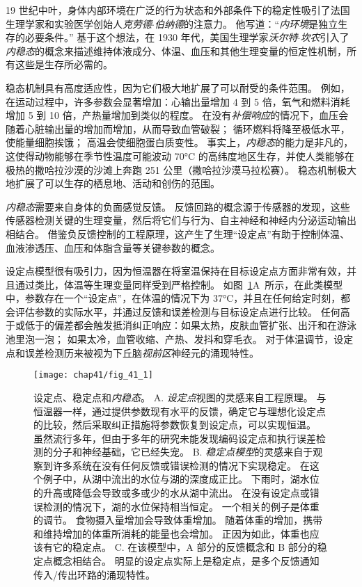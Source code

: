 19 世纪中叶，身体内部环境在广泛的行为状态和外部条件下的稳定性吸引了法国生理学家和实验医学创始人\textit{克劳德$\cdot$伯纳德}的注意力。
他写道：“\textit{内环境}是独立生存的必要条件。” 
基于这个想法，在 1930 年代，美国生理学家\textit{沃尔特$\cdot$坎农}引入了\textit{内稳态}的概念来描述维持体液成分、体温、血压和其他生理变量的恒定性机制，所有这些是生存所必需的。


稳态机制具有高度适应性，因为它们极大地扩展了可以耐受的条件范围。
例如，在运动过程中，许多参数会显著增加：心输出量增加 4 到 5 倍，氧气和燃料消耗增加 5 到 10 倍，产热量增加到类似的程度。
在没有\textit{补偿响应}的情况下，血压会随着心脏输出量的增加而增加，从而导致血管破裂；
循环燃料将降至极低水平，使能量细胞挨饿；
高温会使细胞蛋白质变性。
事实上，\textit{内稳态}的能力是非凡的，这使得动物能够在季节性温度可能波动 70°C 的高纬度地区生存，并使人类能够在极热的撒哈拉沙漠的沙滩上奔跑 251 公里（撒哈拉沙漠马拉松赛）。
稳态机制极大地扩展了可以生存的栖息地、活动和创伤的范围。


\textit{内稳态}需要来自身体的负面感觉反馈。
反馈回路的概念源于传感器的发现，这些传感器检测关键的生理变量，然后将它们与行为、自主神经和神经内分泌运动输出相结合。
借鉴负反馈控制的工程原理，这产生了生理“设定点”有助于控制体温、血液渗透压、血压和体脂含量等关键参数的概念。


设定点模型很有吸引力，因为恒温器在将室温保持在目标设定点方面非常有效，并且通过类比，体温等生理变量同样受到严格控制。
如图~\ref{fig:41_1}A~所示，在此类模型中，参数存在一个“设定点”，在体温的情况下为 37°C，并且在任何给定时刻，都会评估参数的实际水平，并通过反馈和误差检测与目标设定点进行比较。
任何高于或低于的偏差都会触发抵消纠正响应：如果太热，皮肤血管扩张、出汗和在游泳池里泡一泡；
如果太冷，血管收缩、产热、发抖和穿毛衣。
对于体温调节，设定点和误差检测历来被视为下丘脑\textit{视前区}神经元的涌现特性。


\begin{figure}[htbp]
	\centering
	\texttt{[image: chap41/fig\_41\_1]}
	\caption{设定点、稳定点和\textit{内稳态}。
		A. \textit{设定点}视图的灵感来自工程原理。
		与恒温器一样，通过提供参数现有水平的反馈，确定它与理想化设定点的比较，然后采取纠正措施将参数恢复到设定点，可以实现恒温。
		虽然流行多年，但由于多年的研究未能发现编码设定点和执行误差检测的分子和神经基础，它已经失宠。
		B. \textit{稳定点模型}的灵感来自于观察到许多系统在没有任何反馈或错误检测的情况下实现稳定。
		在这个例子中，从湖中流出的水位与湖的深度成正比。
		下雨时，湖水位的升高或降低会导致或多或少的水从湖中流出。
		在没有设定点或错误检测的情况下，湖的水位保持相当恒定。
		一个相关的例子是体重的调节。
		食物摄入量增加会导致体重增加。 随着体重的增加，携带和维持增加的体重所消耗的能量也会增加。
		正因为如此，体重也应该有它的稳定点\cite{speakman2011set}。
		C. 在该模型中，A 部分的反馈概念和 B 部分的稳定点概念相结合。
		明显的设定点实际上是稳定点，是多个反馈通知传入/传出环路的涌现特性。}
	\label{fig:41_1}
\end{figure}


